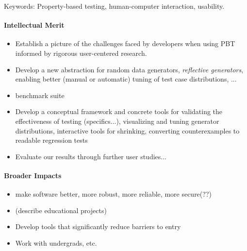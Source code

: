 Keywords: Property-based testing, human-computer interaction,
usability.

\paragraph*{Intellectual Merit}
\begin{itemize}
\item Establish a picture of the challenges
faced by developers when using PBT informed by rigorous user-centered research.
\item Develop a new abstraction for random data generators, {\em
  reflective generators}, enabling better (manual or automatic) tuning of test case
distributions, ...
\item benchmark suite
\item Develop a conceptual framework and concrete tools for validating
the effectiveness of testing (specifics...),
visualizing and tuning generator distributions,
interactive tools for shrinking,
converting counterexamples to readable regression tests
\item Evaluate our results through further user studies...
\end{itemize}

\paragraph*{Broader Impacts}
\begin{itemize}
\item make software better, more robust, more reliable, more secure(??)
\item (describe educational projects)
\item Develop tools that significantly reduce barriers to entry
\item Work with undergrads, etc.
\end{itemize}

